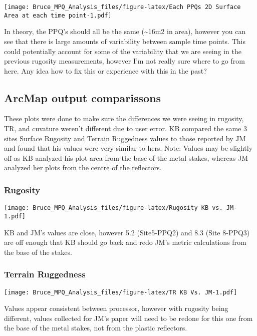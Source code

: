 \documentclass[]{article}
\begin{document}
\texttt{[image: Bruce\_MPQ\_Analysis\_files/figure-latex/Each PPQs 2D Surface Area at each time point-1.pdf]}

In theory, the PPQ's should all be the same (\textasciitilde{}16m2 in
area), however you can see that there is large amounts of variability
between sample time points. This could potentially account for some of
the variability that we are seeing in the previous rugosity
measurements, however I'm not really sure where to go from here. Any
idea how to fix this or experience with this in the past?

\hypertarget{arcmap-output-comparissons}{%
\subsection{ArcMap output
comparissons}\label{arcmap-output-comparissons}}

These plots were done to make sure the differences we were seeing in
rugosity, TR, and cuvature weren't different due to user error. KB
compared the same 3 sites Surface Rugosity and Terrain Ruggedness values
to those reported by JM and found that his values were very similar to
hers. Note: Values may be slightly off as KB analyzed his plot area from
the base of the metal stakes, whereas JM analyzed her plots from the
centre of the reflectors.

\hypertarget{rugosity-4}{%
\subsubsection{Rugosity}\label{rugosity-4}}

\texttt{[image: Bruce\_MPQ\_Analysis\_files/figure-latex/Rugosity KB vs. JM-1.pdf]}

KB and JM's values are close, however 5.2 (Site5-PPQ2) and 8.3 (Site
8-PPQ3) are off enough that KB should go back and redo JM's metric
calculations from the base of the stakes.

\hypertarget{terrain-ruggedness-4}{%
\subsubsection{Terrain Ruggedness}\label{terrain-ruggedness-4}}

\texttt{[image: Bruce\_MPQ\_Analysis\_files/figure-latex/TR KB Vs. JM-1.pdf]}

Values appear consistent between processor, however with rugosity being
different, values collected for JM's paper will need to be redone for
this one from the base of the metal stakes, not from the plastic
reflectors.
\end{document}
